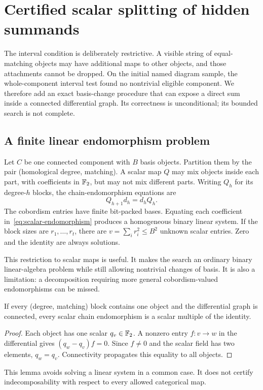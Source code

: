 \section{Certified scalar splitting of hidden summands}
\label{sec:fitting}

The interval condition is deliberately restrictive. A visible string of
equal-matching objects may have additional maps to other objects, and those
attachments cannot be dropped. On the initial named diagram sample, the
whole-component interval test found no nontrivial eligible component. We
therefore add an exact basis-change procedure that can expose a direct sum
inside a connected differential graph. Its correctness is unconditional;
its bounded search is not complete.

\subsection{A finite linear endomorphism problem}
Let $C$ be one connected component with $B$ basis objects. Partition them by
the pair (homological degree, matching). A scalar map $Q$ may mix objects
inside each part, with coefficients in $\mathbb F_2$, but may not mix different parts.
Writing $Q_h$ for its degree-$h$ blocks, the chain-endomorphism equations are
\begin{equation}\label{eq:scalar-endomorphism}
 Q_{h+1}d_h=d_hQ_h.
\end{equation}
The cobordism entries have finite bit-packed bases. Equating each coefficient
in~\eqref{eq:scalar-endomorphism} produces a homogeneous binary linear system.
If the block sizes are $r_1,\ldots,r_t$, there are
$v=\sum_i r_i^2\le B^2$ unknown scalar entries. Zero and the identity are
always solutions.

This restriction to scalar maps is useful. It makes the search an ordinary
binary linear-algebra problem while still allowing nontrivial changes of
basis. It is also a limitation: a decomposition requiring more general
cobordism-valued endomorphisms can be missed.

\begin{lemma}\label{lem:scalar-skip}
If every (degree, matching) block contains one object and the differential
graph is connected, every scalar chain endomorphism is a scalar multiple of
the identity.
\end{lemma}
\begin{proof}
Each object has one scalar $q_v\in\mathbb F_2$. A nonzero entry $f:v\to w$ in
the differential gives $(q_w-q_v)f=0$. Since $f\ne0$ and the scalar field has
two elements, $q_w=q_v$. Connectivity propagates this equality to all objects.
\end{proof}
This lemma avoids solving a linear system in a common case. It does not
certify indecomposability with respect to every allowed categorical map.

